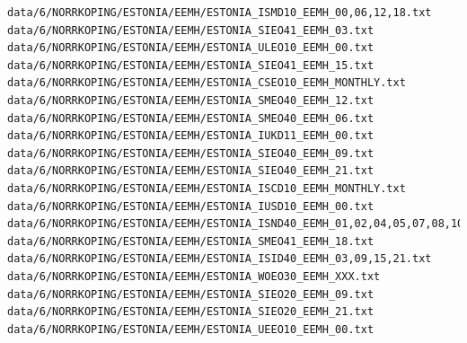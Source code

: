 \documentclass[12pt,a4paper]{article}
\begin{document}
\begin{lstlisting}[breaklines]
data/6/NORRKOPING/ESTONIA/EEMH/ESTONIA_ISMD10_EEMH_00,06,12,18.txt
data/6/NORRKOPING/ESTONIA/EEMH/ESTONIA_SIEO41_EEMH_03.txt
data/6/NORRKOPING/ESTONIA/EEMH/ESTONIA_ULEO10_EEMH_00.txt
data/6/NORRKOPING/ESTONIA/EEMH/ESTONIA_SIEO41_EEMH_15.txt
data/6/NORRKOPING/ESTONIA/EEMH/ESTONIA_CSEO10_EEMH_MONTHLY.txt
data/6/NORRKOPING/ESTONIA/EEMH/ESTONIA_SMEO40_EEMH_12.txt
data/6/NORRKOPING/ESTONIA/EEMH/ESTONIA_SMEO40_EEMH_06.txt
data/6/NORRKOPING/ESTONIA/EEMH/ESTONIA_IUKD11_EEMH_00.txt
data/6/NORRKOPING/ESTONIA/EEMH/ESTONIA_SIEO40_EEMH_09.txt
data/6/NORRKOPING/ESTONIA/EEMH/ESTONIA_SIEO40_EEMH_21.txt
data/6/NORRKOPING/ESTONIA/EEMH/ESTONIA_ISCD10_EEMH_MONTHLY.txt
data/6/NORRKOPING/ESTONIA/EEMH/ESTONIA_IUSD10_EEMH_00.txt
data/6/NORRKOPING/ESTONIA/EEMH/ESTONIA_ISND40_EEMH_01,02,04,05,07,08,10,11,13,14,16,17,19,20,22,23.txt
data/6/NORRKOPING/ESTONIA/EEMH/ESTONIA_SMEO41_EEMH_18.txt
data/6/NORRKOPING/ESTONIA/EEMH/ESTONIA_ISID40_EEMH_03,09,15,21.txt
data/6/NORRKOPING/ESTONIA/EEMH/ESTONIA_WOEO30_EEMH_XXX.txt
data/6/NORRKOPING/ESTONIA/EEMH/ESTONIA_SIEO20_EEMH_09.txt
data/6/NORRKOPING/ESTONIA/EEMH/ESTONIA_SIEO20_EEMH_21.txt
data/6/NORRKOPING/ESTONIA/EEMH/ESTONIA_UEEO10_EEMH_00.txt
\end{lstlisting}
\end{document}
